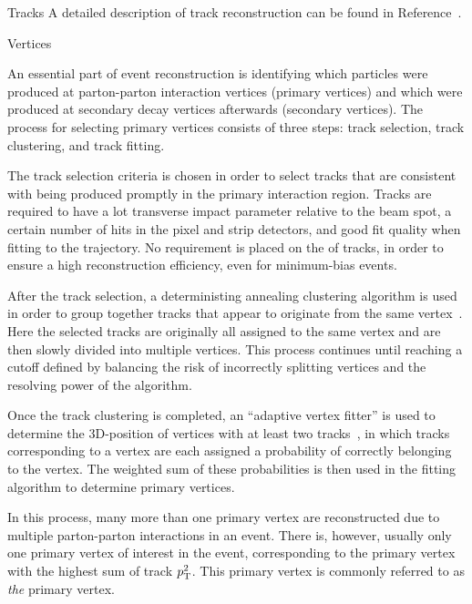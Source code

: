 \begin{section}{Tracks}
A detailed description of track reconstruction can be found in Reference~\cite{Chatrchyan:2014fea}.

\begin{subsection}{Vertices}

An essential part of event reconstruction is identifying which particles were produced at parton-parton interaction vertices (primary vertices) and which were produced at secondary decay vertices afterwards (secondary vertices).
The process for selecting primary vertices consists of three steps: track selection, track clustering, and track fitting.

The track selection criteria is chosen in order to select tracks that are consistent with being produced promptly in the primary interaction region.
Tracks are required to have a lot transverse impact parameter relative to the beam spot, a certain number of hits in the pixel and strip detectors, and good fit quality when fitting to the trajectory.
No requirement is placed on the \pT of tracks, in order to ensure a high reconstruction efficiency, even for minimum-bias events.

After the track selection, a deterministing annealing clustering algorithm is used in order to group together tracks that appear to originate from the same vertex~\cite{726788}.
Here the selected tracks are originally all assigned to the same vertex and are then slowly divided into multiple vertices.
This process continues until reaching a cutoff defined by balancing the risk of incorrectly splitting vertices and the resolving power of the algorithm.

Once the track clustering is completed, an ``adaptive vertex fitter'' is used to determine the 3D-position of vertices with at least two tracks~\cite{Fruhwirth:1027031}, in which tracks corresponding to a vertex are each assigned a probability of correctly belonging to the vertex.
The weighted sum of these probabilities is then used in the fitting algorithm to determine primary vertices.

In this process, many more than one primary vertex are reconstructed due to multiple parton-parton interactions in an event.
There is, however, usually only one primary vertex of interest in the event, corresponding to the primary vertex with the highest sum of track $p_\mathrm{T}^2$.
This primary vertex is commonly referred to as \textit{the} primary vertex.
 
\end{subsection}

\end{section}

